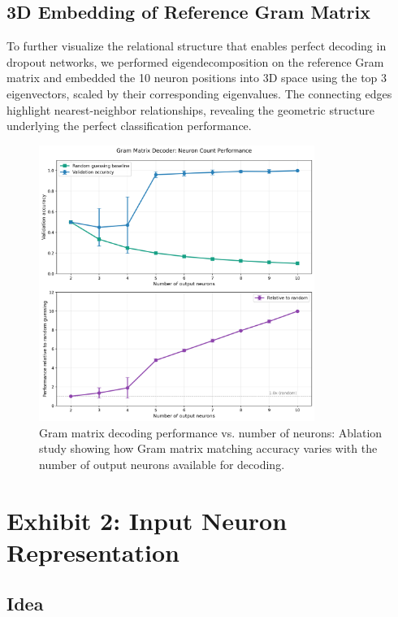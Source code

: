 \documentclass[11pt]{article}
\begin{document}
\subsection{3D Embedding of Reference Gram Matrix}

To further visualize the relational structure that enables perfect decoding in dropout networks, we performed eigendecomposition on the reference Gram matrix and embedded the 10 neuron positions into 3D space using the top 3 eigenvectors, scaled by their corresponding eigenvalues. The connecting edges highlight nearest-neighbor relationships, revealing the geometric structure underlying the perfect classification performance.

\begin{figure}[htbp]
\centering
\includegraphics[width=0.8\textwidth]{figures/gram_neuron_ablation_plot.png}
\caption{Gram matrix decoding performance vs. number of neurons: Ablation study showing how Gram matrix matching accuracy varies with the number of output neurons available for decoding.}
\label{fig:gram-ablation}
\end{figure}

\section{Exhibit 2: Input Neuron Representation}

\subsection{Idea}
\end{document}
